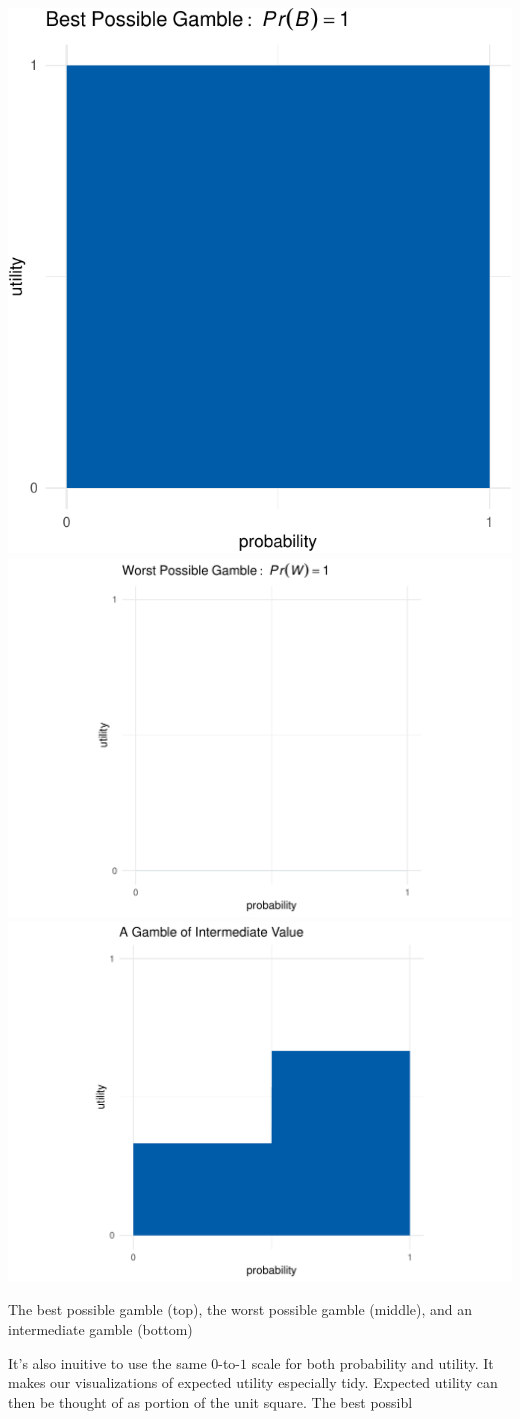 \documentclass[justified]{tufte-book}
\theoremstyle{definition}
\theoremstyle{definition}
\theoremstyle{definition}
\theoremstyle{remark}
\begin{document}
\begin{marginfigure}
\includegraphics{_main_files/figure-latex/unnamed-chunk-113-1} \includegraphics{_main_files/figure-latex/unnamed-chunk-113-2} \includegraphics{_main_files/figure-latex/unnamed-chunk-113-3} \caption[The best possible gamble (top), the worst possible gamble (middle), and an intermediate gamble (bottom)]{The best possible gamble (top), the worst possible gamble (middle), and an intermediate gamble (bottom)}\label{fig:unnamed-chunk-113}
\end{marginfigure}

It's also inuitive to use the same \(0\)-to-\(1\) scale for both probability and utility. It makes our visualizations of expected utility especially tidy. Expected utility can then be thought of as portion of the unit square. The best possibl
\end{document}
